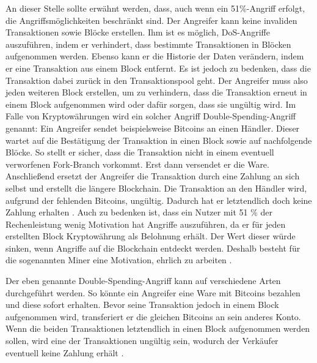 An dieser Stelle sollte erwähnt werden, dass, auch wenn ein 51\%-Angriff erfolgt, die Angriffsmöglichkeiten beschränkt sind. Der Angreifer kann keine invaliden Transaktionen sowie Blöcke erstellen. Ihm ist es möglich, \acs{DoS}-Angriffe auszuführen, indem er verhindert, dass bestimmte Transaktionen in Blöcken aufgenommen werden. Ebenso kann er die Historie der Daten verändern, indem er eine Transaktion aus einem Block entfernt. Es ist jedoch zu bedenken, dass die Transaktion dabei zurück in den Transaktionspool geht. Der Angreifer muss also jeden weiteren Block erstellen, um zu verhindern, dass die Transaktion erneut in einem Block aufgenommen wird oder dafür sorgen, dass sie ungültig wird. Im Falle von Kryptowährungen wird ein solcher Angriff Double-Spending-Angriff genannt: Ein Angreifer sendet beispielsweise Bitcoins an einen Händler. Dieser wartet auf die Bestätigung der Transaktion in einen Block sowie auf nachfolgende Blöcke. So stellt er sicher, dass die Transaktion nicht in einem eventuell verworfenen Fork-Branch vorkommt. Erst dann versendet er die Ware. Anschließend ersetzt der Angreifer die Transaktion durch eine Zahlung an sich selbst und erstellt die längere Blockchain. Die Transaktion an den Händler wird, aufgrund der fehlenden Bitcoins, ungültig. Dadurch hat er letztendlich doch keine Zahlung erhalten \cite{EthereumTeamEthereumWhitePaper2017}. Auch zu bedenken ist, dass ein Nutzer mit 51 \% der Rechenleistung wenig Motivation hat Angriffe auszuführen, da er für jeden erstellten Block Kryptowährung als Belohnung erhält. Der Wert dieser würde sinken, wenn Angriffe auf die Blockchain entdeckt werden. Deshalb besteht für die sogenannten Miner eine Motivation, ehrlich zu arbeiten \cite[S.196 ff.]{AntonopoulosMasteringbitcoin2015}.

Der eben genannte Double-Spending-Angriff kann auf verschiedene Arten durchgeführt werden. So könnte ein Angreifer eine Ware mit Bitcoins bezahlen und diese sofort erhalten. Bevor seine Transaktion jedoch in einem Block aufgenommen wird, transferiert er die gleichen Bitcoins an sein anderes Konto. Wenn die beiden Transaktionen letztendlich in einen Block aufgenommen werden sollen, wird eine der Transaktionen ungültig sein, wodurch der Verkäufer eventuell keine Zahlung erhält \cite[S.~211 ff.]{AntonopoulosMasteringbitcoin2015}.

